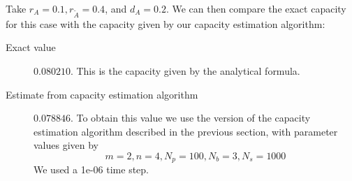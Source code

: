 


Take $r_A = 0.1, r_{\tilde{A}} = 0.4$, and $d_A = 0.2$. We can then compare the exact capacity for this case with the capacity given by our capacity estimation algorithm:

\begin{description}
\item[Exact value]  $ 0.080210 $. This is the capacity given by the analytical formula.
\item[Estimate from capacity estimation algorithm]  $ 0.078846 $. To obtain this value we use the version of the capacity estimation algorithm described in the previous section, with parameter values given by 
\begin{equation*}
m = 2, n = 4, 
N_p = 100, N_b = 3,
N_s = 1000
\end{equation*}
We used a 1e-06 time step.
\end{description}
